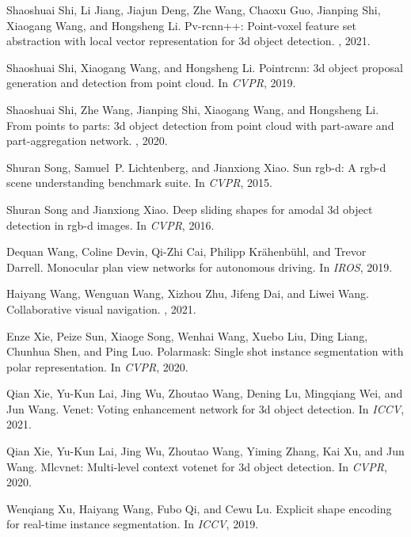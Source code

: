 \documentclass[final]{cvpr}
\begin{document}
{\begin{thebibliography}{10}
Shaoshuai Shi, Li Jiang, Jiajun Deng, Zhe Wang, Chaoxu Guo, Jianping Shi,
  Xiaogang Wang, and Hongsheng Li.
\newblock Pv-rcnn++: Point-voxel feature set abstraction with local vector
  representation for 3d object detection.
, 2021.

Shaoshuai Shi, Xiaogang Wang, and Hongsheng Li.
\newblock Pointrcnn: 3d object proposal generation and detection from point
  cloud.
\newblock In {\em CVPR}, 2019.

Shaoshuai Shi, Zhe Wang, Jianping Shi, Xiaogang Wang, and Hongsheng Li.
\newblock From points to parts: 3d object detection from point cloud with
  part-aware and part-aggregation network.
, 2020.

Shuran Song, Samuel~P. Lichtenberg, and Jianxiong Xiao.
\newblock Sun rgb-d: A rgb-d scene understanding benchmark suite.
\newblock In {\em CVPR}, 2015.

Shuran Song and Jianxiong Xiao.
\newblock Deep sliding shapes for amodal 3d object detection in rgb-d images.
\newblock In {\em CVPR}, 2016.

Dequan Wang, Coline Devin, Qi-Zhi Cai, Philipp Kr{\"a}henb{\"u}hl, and Trevor
  Darrell.
\newblock Monocular plan view networks for autonomous driving.
\newblock In {\em IROS}, 2019.

Haiyang Wang, Wenguan Wang, Xizhou Zhu, Jifeng Dai, and Liwei Wang.
\newblock Collaborative visual navigation.
, 2021.

Enze Xie, Peize Sun, Xiaoge Song, Wenhai Wang, Xuebo Liu, Ding Liang, Chunhua
  Shen, and Ping Luo.
\newblock Polarmask: Single shot instance segmentation with polar
  representation.
\newblock In {\em CVPR}, 2020.

Qian Xie, Yu-Kun Lai, Jing Wu, Zhoutao Wang, Dening Lu, Mingqiang Wei, and Jun
  Wang.
\newblock Venet: Voting enhancement network for 3d object detection.
\newblock In {\em ICCV}, 2021.

Qian Xie, Yu-Kun Lai, Jing Wu, Zhoutao Wang, Yiming Zhang, Kai Xu, and Jun
  Wang.
\newblock Mlcvnet: Multi-level context votenet for 3d object detection.
\newblock In {\em CVPR}, 2020.

Wenqiang Xu, Haiyang Wang, Fubo Qi, and Cewu Lu.
\newblock Explicit shape encoding for real-time instance segmentation.
\newblock In {\em ICCV}, 2019.


\end{thebibliography}}
\end{document}
